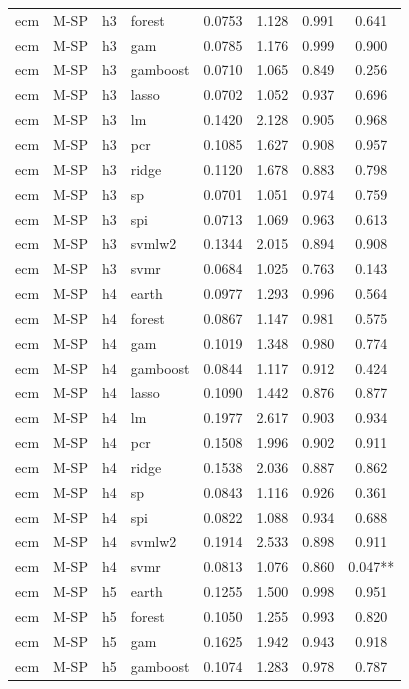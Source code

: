 \begin{ThreePartTable}
\begin{longtable}[t]{llclcccc}
ecm & M-SP & h3 & forest & 0.0753 & 1.128 & 0.991 & 0.641\\
ecm & M-SP & h3 & gam & 0.0785 & 1.176 & 0.999 & 0.900\\
ecm & M-SP & h3 & gamboost & 0.0710 & 1.065 & 0.849 & 0.256\\
ecm & M-SP & h3 & lasso & 0.0702 & 1.052 & 0.937 & 0.696\\
ecm & M-SP & h3 & lm & 0.1420 & 2.128 & 0.905 & 0.968\\
ecm & M-SP & h3 & pcr & 0.1085 & 1.627 & 0.908 & 0.957\\
ecm & M-SP & h3 & ridge & 0.1120 & 1.678 & 0.883 & 0.798\\
ecm & M-SP & h3 & sp & 0.0701 & 1.051 & 0.974 & 0.759\\
ecm & M-SP & h3 & spi & 0.0713 & 1.069 & 0.963 & 0.613\\
ecm & M-SP & h3 & svmlw2 & 0.1344 & 2.015 & 0.894 & 0.908\\
ecm & M-SP & h3 & svmr & 0.0684 & 1.025 & 0.763 & 0.143\\
\addlinespace
ecm & M-SP & h4 & earth & 0.0977 & 1.293 & 0.996 & 0.564\\
ecm & M-SP & h4 & forest & 0.0867 & 1.147 & 0.981 & 0.575\\
ecm & M-SP & h4 & gam & 0.1019 & 1.348 & 0.980 & 0.774\\
ecm & M-SP & h4 & gamboost & 0.0844 & 1.117 & 0.912 & 0.424\\
ecm & M-SP & h4 & lasso & 0.1090 & 1.442 & 0.876 & 0.877\\
ecm & M-SP & h4 & lm & 0.1977 & 2.617 & 0.903 & 0.934\\
ecm & M-SP & h4 & pcr & 0.1508 & 1.996 & 0.902 & 0.911\\
ecm & M-SP & h4 & ridge & 0.1538 & 2.036 & 0.887 & 0.862\\
ecm & M-SP & h4 & sp & 0.0843 & 1.116 & 0.926 & 0.361\\
ecm & M-SP & h4 & spi & 0.0822 & 1.088 & 0.934 & 0.688\\
ecm & M-SP & h4 & svmlw2 & 0.1914 & 2.533 & 0.898 & 0.911\\
ecm & M-SP & h4 & svmr & 0.0813 & 1.076 & 0.860 & 0.047**\\
\addlinespace
ecm & M-SP & h5 & earth & 0.1255 & 1.500 & 0.998 & 0.951\\
ecm & M-SP & h5 & forest & 0.1050 & 1.255 & 0.993 & 0.820\\
ecm & M-SP & h5 & gam & 0.1625 & 1.942 & 0.943 & 0.918\\
ecm & M-SP & h5 & gamboost & 0.1074 & 1.283 & 0.978 & 0.787\\

\end{longtable}
\end{ThreePartTable}
